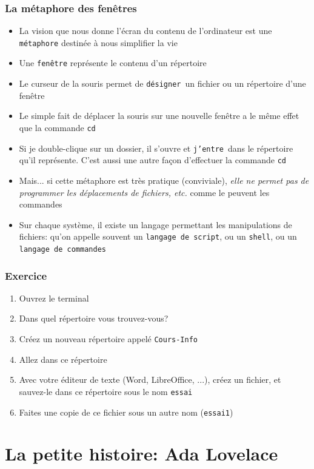 \documentclass{beamer}
\newcommand{\mypause}{\pause}
\newcommand{\prog}[1]{\alert{\texttt{#1}}}
\begin{document}
\frame
{
\frametitle{La métaphore des fenêtres}
{\footnotesize
\begin{itemize}
\item La vision que nous donne l'écran du contenu de l'ordinateur est une \prog{métaphore} 
destinée à nous simplifier la vie \mypause{}
\item Une \prog{fenêtre} représente le contenu d'un répertoire \mypause{}
\item Le curseur de la souris permet de \prog{désigner} un fichier ou un répertoire d'une fenêtre \mypause{}
\item Le simple fait de déplacer la souris sur une nouvelle fenêtre a le même effet que 
la commande \prog{cd} \mypause{}
\item Si je double-clique sur un dossier, il s'ouvre et \prog{j'entre} dans le répertoire qu'il représente.
C'est aussi une autre façon d'effectuer la commande \prog{cd}
\mypause{}
\item Mais... si cette métaphore est très pratique (conviviale), {\em elle ne permet pas de 
programmer les déplacements de fichiers, etc.} comme le peuvent les commandes \mypause{}
\item Sur chaque système, il existe un langage permettant les manipulations de fichiers: 
qu'on appelle souvent un \prog{langage de script}, ou un \prog{shell}, ou un \prog{langage de commandes}
\end{itemize}
}
}

\frame
{
\frametitle{Exercice}
{\footnotesize
\begin{enumerate}
\item Ouvrez le terminal\mypause{}
\item Dans quel répertoire vous trouvez-vous?\mypause{}
\item Créez un nouveau répertoire appelé \texttt{Cours-Info}\mypause{}
\item Allez dans ce répertoire\mypause{}
\item Avec votre éditeur de texte (Word, LibreOffice, ...), créez un fichier, et
sauvez-le dans ce répertoire sous le nom \prog{essai}\mypause{}
\item Faites une copie de ce fichier sous un autre nom (\prog{essai1})\mypause{}
\end{enumerate}
}
}


\section{La petite histoire: Ada Lovelace}
\end{document}

